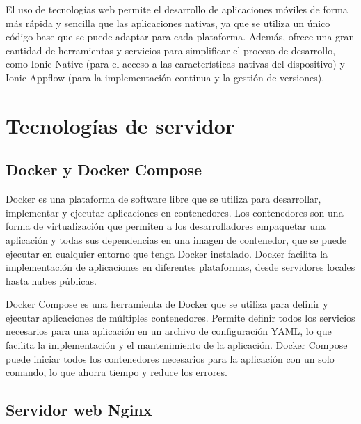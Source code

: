El uso de tecnologías web permite el desarrollo de aplicaciones móviles de forma más rápida y sencilla que las aplicaciones nativas, ya que se utiliza un único código base que se puede adaptar para cada plataforma. Además, ofrece una gran cantidad de herramientas y servicios para simplificar el proceso de desarrollo, como Ionic Native (para el acceso a las características nativas del dispositivo) y Ionic Appflow (para la implementación continua y la gestión de versiones).


\section{Tecnologías de servidor}
\label{sec:servidor}

\subsection{Docker y Docker Compose}
\label{subsec:docker}

Docker \cite{WEBSITE:docker} es una plataforma de software libre que se utiliza para desarrollar, implementar y ejecutar aplicaciones en contenedores. Los contenedores son una forma de virtualización que permiten a los desarrolladores empaquetar una aplicación y todas sus dependencias en una imagen de contenedor, que se puede ejecutar en cualquier entorno que tenga Docker instalado. Docker facilita la implementación de aplicaciones en diferentes plataformas, desde servidores locales hasta nubes públicas.

Docker Compose \cite{WEBSITE:docker-compose} es una herramienta de Docker que se utiliza para definir y ejecutar aplicaciones de múltiples contenedores. Permite definir todos los servicios necesarios para una aplicación en un archivo de configuración YAML, lo que facilita la implementación y el mantenimiento de la aplicación. Docker Compose puede iniciar todos los contenedores necesarios para la aplicación con un solo comando, lo que ahorra tiempo y reduce los errores.

\subsection{Servidor web Nginx}
\label{subsec:servidorweb}

